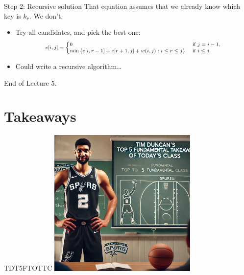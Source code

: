 \documentclass[aspectratio=169]{beamer}
\begin{document}
\begin{frame}{Step 2: Recursive solution}
    That equation assumes that we already know which key is $k_r$.  We don’t.
    \begin{itemize}
        \item Try all candidates, and pick the best one:
            \begin{equation*}
                \scriptsize
                \begin{align*}
                    e[i, j] =
                        \begin{cases}
                            0 & \text{ if } j = i - 1 \text{,} \\
                            \min \left \{ e[i, r-1] + e[r+1, j] + w(i, j):i \leq r \leq j \right \} & \text{ if } i \leq j \text{.}
                        \end{cases}
                \end{align*}
            \end{equation*}
        \item Could write a recursive algorithm\ldots
    \end{itemize}
\end{frame}


\begin{frame}{}
    \centering
    \Huge End of Lecture 5.
\end{frame}

\section*{Takeaways}

\begin{frame}{TDT5FTOTTC}
    \centering
    \includegraphics[width=0.55\textwidth]{figures/tim.png}
\end{frame}
\end{document}

